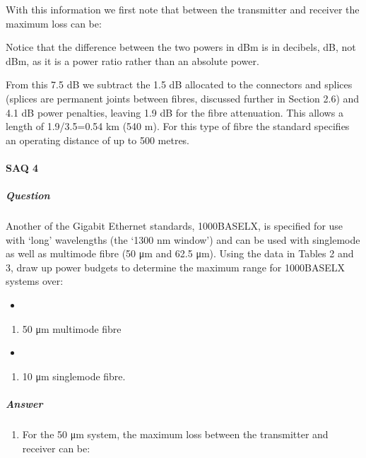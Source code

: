 \documentclass[letterpaper,10pt,english]{sphinxmanual}
\let\sphinxpxdimen\pdfpxdimen\else\newdimen\sphinxpxdimen
\begin{document}
With this information we first note that between the transmitter and receiver the maximum loss can be:

\sphinxincludegraphics[width=511\sphinxpxdimen,height=289\sphinxpxdimen]{{t305_ue012i}.gif}

Notice that the difference between the two powers in dBm is in decibels, dB, not dBm, as it is a power ratio rather than an absolute power.

From this 7.5 dB we subtract the 1.5 dB allocated to the connectors and splices (splices are permanent joints between fibres, discussed further in Section 2.6) and 4.1 dB power penalties, leaving 1.9 dB for the fibre attenuation. This allows a length of 1.9/3.5=0.54 km (540 m). For this type of fibre the standard specifies an operating distance of up to 500 metres.


\paragraph{SAQ 4}
\label{\detokenize{content/session_00/Part_00_02:SAQ-4}}

\subparagraph{Question}
\label{\detokenize{content/session_00/Part_00_02:id7}}
Another of the Gigabit Ethernet standards, 1000BASE\sphinxhyphen{}LX, is specified for use with ‘long’ wavelengths (the ‘1300 nm window’) and can be used with single\sphinxhyphen{}mode as well as multimode fibre (50 μm and 62.5 μm). Using the data in Tables 2 and 3, draw up power budgets to determine the maximum range for 1000BASE\sphinxhyphen{}LX systems over:
\begin{itemize}
\item {} 
\end{itemize}
\begin{enumerate}
%
\item {} 
50 μm multimode fibre

\end{enumerate}
\begin{itemize}
\item {} 
\end{itemize}
\begin{enumerate}
%
\setcounter{enumi}{1}
\item {} 
10 μm single\sphinxhyphen{}mode fibre.

\end{enumerate}


\subparagraph{Answer}
\label{\detokenize{content/session_00/Part_00_02:id8}}\begin{enumerate}
%
\item {} 
For the 50 μm system, the maximum loss between the transmitter and receiver can be:

\end{enumerate}
\end{document}
